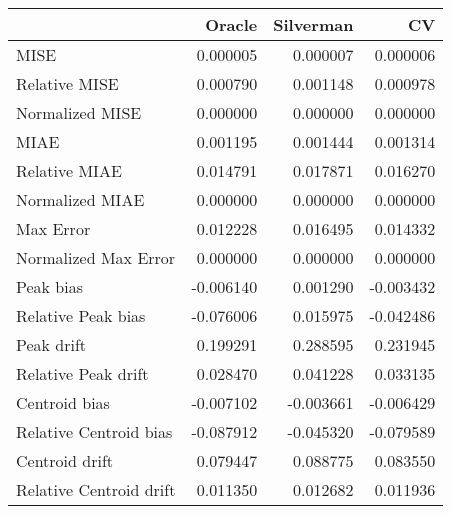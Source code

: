 \begin{tabular}{lrrr}
  \hline
 & Oracle & Silverman & CV \\ 
  \hline
MISE & 0.000005 & 0.000007 & 0.000006 \\ 
  Relative MISE & 0.000790 & 0.001148 & 0.000978 \\ 
  Normalized MISE & 0.000000 & 0.000000 & 0.000000 \\ 
  MIAE & 0.001195 & 0.001444 & 0.001314 \\ 
  Relative MIAE & 0.014791 & 0.017871 & 0.016270 \\ 
  Normalized MIAE & 0.000000 & 0.000000 & 0.000000 \\ 
  Max Error & 0.012228 & 0.016495 & 0.014332 \\ 
  Normalized Max Error & 0.000000 & 0.000000 & 0.000000 \\ 
  Peak bias & -0.006140 & 0.001290 & -0.003432 \\ 
  Relative Peak bias & -0.076006 & 0.015975 & -0.042486 \\ 
  Peak drift & 0.199291 & 0.288595 & 0.231945 \\ 
  Relative Peak drift & 0.028470 & 0.041228 & 0.033135 \\ 
  Centroid bias & -0.007102 & -0.003661 & -0.006429 \\ 
  Relative Centroid bias & -0.087912 & -0.045320 & -0.079589 \\ 
  Centroid drift & 0.079447 & 0.088775 & 0.083550 \\ 
  Relative Centroid drift & 0.011350 & 0.012682 & 0.011936 \\ 
   \hline
\end{tabular}
